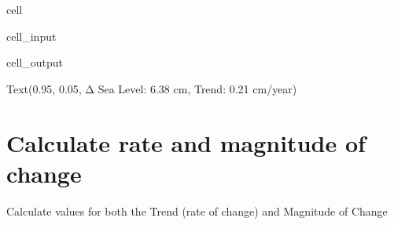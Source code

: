 \documentclass[letterpaper,10pt,english]{jupyterBook}
\begin{document}
\begin{sphinxuseclass}{cell}
\begin{sphinxVerbatimInput}
\begin{sphinxuseclass}{cell_input}
\end{sphinxuseclass}\end{sphinxVerbatimInput}
\begin{sphinxVerbatimOutput}

\begin{sphinxuseclass}{cell_output}
\begin{sphinxVerbatim}[commandchars=\\\{\}]
Text(0.95, 0.05, \PYGZsq{}Δ Sea Level: 6.38 cm, Trend: 0.21 cm/year\PYGZsq{})
\end{sphinxVerbatim}

\noindent{}

\end{sphinxuseclass}\end{sphinxVerbatimOutput}

\end{sphinxuseclass}

\chapter{Calculate rate and magnitude of change}
\label{\detokenize{notebooks/regional_and_local/SL_Trend:calculate-rate-and-magnitude-of-change}}
\sphinxAtStartPar
Calculate values for both the Trend (rate of change) and Magnitude of Change
\end{document}
